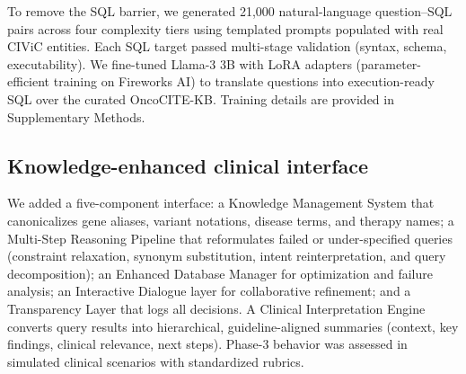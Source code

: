 To remove the SQL barrier, we generated 21,000 natural-language question--SQL pairs across four complexity tiers using templated prompts populated with real CIViC entities. Each SQL target passed multi-stage validation (syntax, schema, executability). We fine-tuned Llama-3 3B with LoRA adapters (parameter-efficient training on Fireworks AI) to translate questions into execution-ready SQL over the curated OncoCITE-KB. Training details are provided in Supplementary Methods.


\subsection*{Knowledge-enhanced clinical interface}

We added a five-component interface: a Knowledge Management System that canonicalizes gene aliases, variant notations, disease terms, and therapy names; a Multi-Step Reasoning Pipeline that reformulates failed or under-specified queries (constraint relaxation, synonym substitution, intent reinterpretation, and query decomposition); an Enhanced Database Manager for optimization and failure analysis; an Interactive Dialogue layer for collaborative refinement; and a Transparency Layer that logs all decisions. A Clinical Interpretation Engine converts query results into hierarchical, guideline-aligned summaries (context, key findings, clinical relevance, next steps). Phase-3 behavior was assessed in simulated clinical scenarios with standardized rubrics.

%
%
%
%
%
%
%

